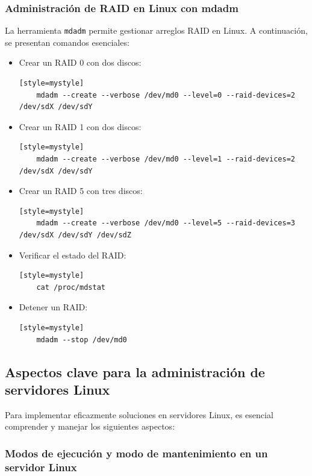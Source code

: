 \subsubsection{Administración de RAID en Linux con mdadm}

La herramienta \texttt{mdadm} permite gestionar arreglos RAID en Linux. A continuación, se presentan comandos esenciales:

\begin{itemize}
  \item Crear un RAID 0 con dos discos:
    \begin{lstlisting}[style=mystyle][style=mystyle]
    mdadm --create --verbose /dev/md0 --level=0 --raid-devices=2 /dev/sdX /dev/sdY
    \end{lstlisting}
  \item Crear un RAID 1 con dos discos:
    \begin{lstlisting}[style=mystyle][style=mystyle]
    mdadm --create --verbose /dev/md0 --level=1 --raid-devices=2 /dev/sdX /dev/sdY
    \end{lstlisting}
  \item Crear un RAID 5 con tres discos:
    \begin{lstlisting}[style=mystyle][style=mystyle]
    mdadm --create --verbose /dev/md0 --level=5 --raid-devices=3 /dev/sdX /dev/sdY /dev/sdZ
    \end{lstlisting}
  \item Verificar el estado del RAID:
    \begin{lstlisting}[style=mystyle][style=mystyle]
    cat /proc/mdstat
    \end{lstlisting}
  \item Detener un RAID:
    \begin{lstlisting}[style=mystyle][style=mystyle]
    mdadm --stop /dev/md0
    \end{lstlisting}
\end{itemize}

\subsection{Aspectos clave para la administración de servidores Linux}

Para implementar eficazmente soluciones en servidores Linux, es esencial comprender y manejar los siguientes aspectos:

\subsubsection{Modos de ejecución y modo de mantenimiento en un servidor Linux}

